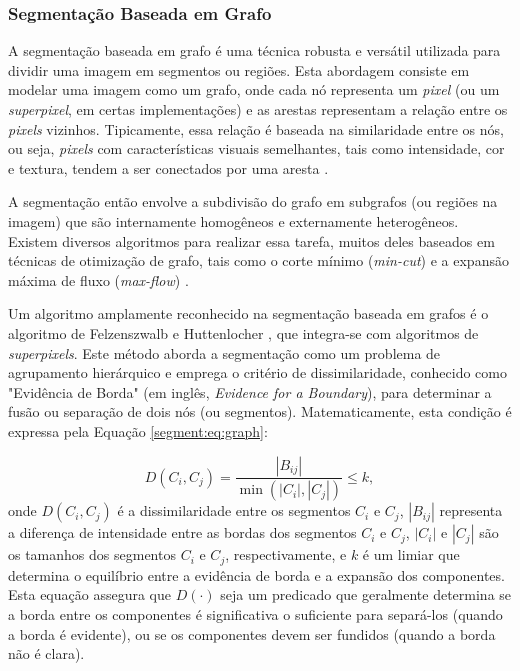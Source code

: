 \subsubsection{Segmentação Baseada em Grafo}
\label{segment:graph}
A segmentação baseada em grafo é uma técnica robusta e versátil utilizada para dividir uma imagem em segmentos ou regiões. Esta abordagem consiste em modelar uma imagem como um grafo, onde cada nó representa um \textit{pixel} (ou um \textit{superpixel}, em certas implementações) e as arestas representam a relação entre os \textit{pixels} vizinhos. Tipicamente, essa relação é baseada na similaridade entre os nós, ou seja, \textit{pixels} com características visuais semelhantes, tais como intensidade, cor e textura, tendem a ser conectados por uma aresta \citep{Felzenszwalb2004EfficientSegmentation}.

A segmentação então envolve a subdivisão do grafo em subgrafos (ou regiões na imagem) que são internamente homogêneos e externamente heterogêneos. Existem diversos algoritmos para realizar essa tarefa, muitos deles baseados em técnicas de otimização de grafo, tais como o corte mínimo (\textit{min-cut}) e a expansão máxima de fluxo (\textit{max-flow}) \citep{Boykov2001FastCuts}.

Um algoritmo amplamente reconhecido na segmentação baseada em grafos é o algoritmo de Felzenszwalb e Huttenlocher \citep{Felzenszwalb2004EfficientSegmentation}, que integra-se com algoritmos de \textit{superpixels}. Este método aborda a segmentação como um problema de agrupamento hierárquico e emprega o critério de dissimilaridade, conhecido como "Evidência de Borda" (em inglês, \textit{Evidence for a Boundary}), para determinar a fusão ou separação de dois nós (ou segmentos). Matematicamente, esta condição é expressa pela Equação \ref{segment:eq:graph}:

\begin{equation}
    \label{segment:eq:graph}
    D(C_i, C_j) = \frac{|B_{ij}|}{\min(|C_i|,|C_j|)} \leq k,
\end{equation}
onde $D(C_i, C_j)$ é a dissimilaridade entre os segmentos $C_i$ e $C_j$, $|B_{ij}|$ representa a diferença de intensidade entre as bordas dos segmentos $C_i$ e $C_j$, $|C_i|$ e $|C_j|$ são os tamanhos dos segmentos $C_i$ e $C_j$, respectivamente, e $k$ é um limiar que determina o equilíbrio entre a evidência de borda e a expansão dos componentes. Esta equação assegura que $D(\cdot)$ seja um predicado que geralmente determina se a borda entre os componentes é significativa o suficiente para separá-los (quando a borda é evidente), ou se os componentes devem ser fundidos (quando a borda não é clara).

